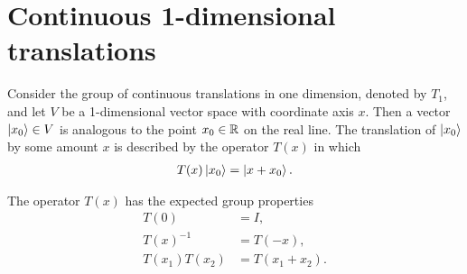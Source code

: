 \section{Continuous 1-dimensional translations}

Consider the group of continuous translations in one dimension, denoted by $T_1$, and let $V$ be a 1-dimensional vector space with coordinate axis $x$. Then a vector $\ket{x_0}\in V$ is analogous to the point $x_0\in\mathbb{R}$ on the real line. The translation of $\ket{x_0}$ by some amount $x$ is described by the operator $T(x)$ in which
\begin{align*}
    T(x)\ket{x_0} = \ket{x+x_0}.
\end{align*}

The operator $T(x)$ has the expected group properties
\begin{align}
    T(0) &= I, \label{eq:P_BC} \\
    T(x)^{-1} &= T(-x), \label{eq:P_inv}\\
    T(x_1)T(x_2) &= T(x_1+x_2).\label{eq:P_add}
\end{align}

